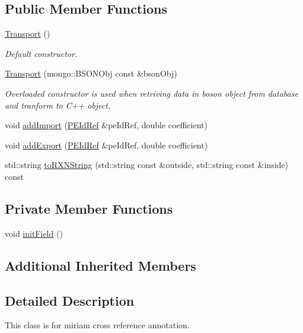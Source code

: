 \subsection*{Public Member Functions}
\begin{DoxyCompactItemize}
\item 
\hyperlink{classunisys_1_1Transport_af3be99c55e210bc3c8205b56e9c97991}{Transport} ()
\begin{DoxyCompactList}\small\item\em Default constructor. \end{DoxyCompactList}\item 
\hyperlink{classunisys_1_1Transport_a11ddfe7770384efc6c45d0d3345e110e}{Transport} (mongo\-::\-B\-S\-O\-N\-Obj const \&bson\-Obj)
\begin{DoxyCompactList}\small\item\em Overloaded constructor is used when retriving data in boson object from database and tranform to C++ object. \end{DoxyCompactList}\item 
void \hyperlink{classunisys_1_1Transport_af8483dd137f4d882b1cc73a842241f76}{add\-Import} (\hyperlink{classunisys_1_1PEIdRef}{P\-E\-Id\-Ref} \&pe\-Id\-Ref, double coefficient)
\item 
void \hyperlink{classunisys_1_1Transport_a47ffd50f8a885493050424f87ab773fd}{add\-Export} (\hyperlink{classunisys_1_1PEIdRef}{P\-E\-Id\-Ref} \&pe\-Id\-Ref, double coefficient)
\item 
std\-::string \hyperlink{classunisys_1_1Transport_a1df6e95965bb238dc0060b11d12be7b0}{to\-R\-X\-N\-String} (std\-::string const \&outside, std\-::string const \&inside) const 
\end{DoxyCompactItemize}
\subsection*{Private Member Functions}
\begin{DoxyCompactItemize}
\item 
void \hyperlink{classunisys_1_1Transport_a04f17e27ff568c45688cde1a95265dea}{init\-Field} ()
\end{DoxyCompactItemize}
\subsection*{Additional Inherited Members}


\subsection{Detailed Description}
This class is for miriam cross reference annotation. 

